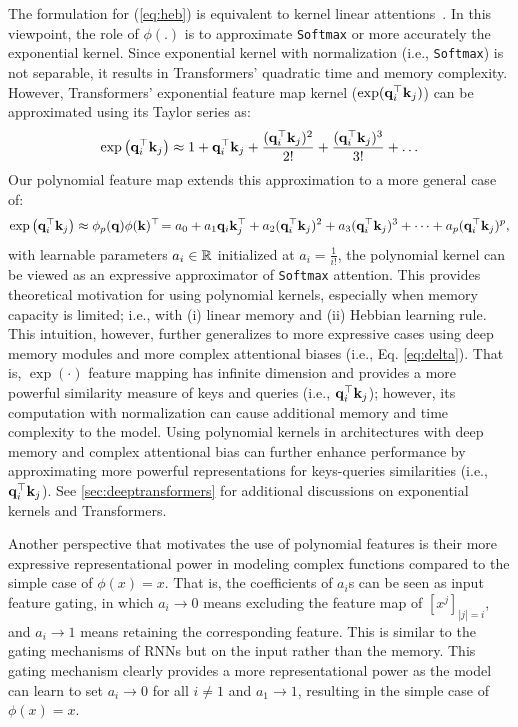 The formulation for (\ref{eq:heb}) is equivalent to kernel linear attentions~\citep{polysketchformer-kacham2024, wang2025test, hua2022transformer, kasai2021finetuning, katharopoulos2020transformers, arora2024simple}. In this viewpoint, the role of $\phi(.)$ is to approximate \texttt{Softmax} or more accurately the exponential kernel. Since exponential kernel with normalization (i.e., \texttt{Softmax}) is not separable, it results in Transformers' quadratic time and memory complexity. However, Transformers' exponential feature map kernel ($\exp(\mathbf{q}_i^{\top} \mathbf{k}_j)$) can be approximated using its Taylor series as:
\begin{align}
    \exp\left(\mathbf{q}_i^{\top} \mathbf{k}_j\right) \approx 1 + \mathbf{q}_i^{\top} \mathbf{k}_j + \frac{(\mathbf{q}_i^{\top} \mathbf{k}_j)^2}{2!} + \frac{(\mathbf{q}_i^{\top} \mathbf{k}_j)^3}{3!} + \dots
\end{align}
Our polynomial feature map extends this approximation to a more general case of:
\begin{align}
    \exp\left(\mathbf{q}_i^{\top} \mathbf{k}_j\right) \approx \phi_p(\mathbf{q}) \phi(\mathbf{k})^{\top} \!= a_0 + a_1 \mathbf{q}_i \mathbf{k}_j^{\top} + a_2 (\mathbf{q}_i^{\top} \mathbf{k}_j)^2 + a_3 (\mathbf{q}_i^{\top} \mathbf{k}_j)^3 + \dots + a_p (\mathbf{q}_i^{\top} \mathbf{k}_j)^p,
\end{align}
with learnable parameters $a_i \in \mathbb{R}$ initialized at $a_i = \frac{1}{i !}$, the polynomial kernel can be viewed as an expressive approximator of \texttt{Softmax} attention. This provides theoretical motivation for using polynomial kernels, especially when memory capacity is limited; i.e., with (i) linear memory and (ii) Hebbian learning rule. This intuition, however, further generalizes to more expressive cases using deep memory modules and more complex attentional biases (i.e., Eq. \ref{eq:delta}). That is, $\exp(\cdot)$ feature mapping
has infinite dimension and provides a more powerful similarity measure of keys and queries (i.e., $\mathbf{q}_i^{\top} \mathbf{k}_j$); however, its computation with normalization can cause additional memory and time complexity to the model. Using polynomial kernels in architectures with deep memory and complex attentional bias can further enhance  performance by approximating  more powerful representations for keys-queries similarities (i.e., $\mathbf{q}_i^{\top} \mathbf{k}_j$). See \autoref{sec:deeptransformers} for additional discussions on exponential kernels and Transformers.  



 Another perspective that motivates the use of polynomial features is their more expressive representational power in modeling complex functions compared to the simple case of $\phi(x) = x$. That is, the coefficients of $a_i$s can be seen as input feature gating, in which $a_i \rightarrow 0$ means excluding the feature map of $[x^j]_{|j| = i}$, and $a_i \rightarrow 1$ means retaining the corresponding feature. This is similar to the gating mechanisms of RNNs but on the input rather than the memory. This gating mechanism clearly provides a more representational power as the model can learn to set $a_i \rightarrow 0$ for all $i \neq 1$ and $a_1 \rightarrow 1$, resulting in the simple case of $\phi(x) = x$. 


